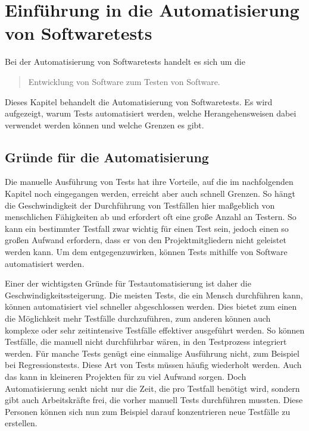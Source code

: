 \section{Einführung in die Automatisierung von Softwaretests}
Bei der Automatisierung von Softwaretests handelt es sich um die \begin{quote}Entwicklung von Software zum Testen von Software.~\cite[section 16.1 paragraph 2]{Gopalaswamy.2009}\end{quote} 
Dieses Kapitel behandelt die Automatisierung von Softwaretests. Es wird aufgezeigt, warum Tests automatisiert werden, welche Herangehensweisen dabei verwendet werden können und welche Grenzen es gibt.

\subsection{Gründe für die Automatisierung}
Die manuelle Ausführung von Tests hat ihre Vorteile, auf die im nachfolgenden Kapitel noch eingegangen werden, erreicht aber auch schnell Grenzen. So hängt die Geschwindigkeit der Durchführung von Testfällen hier maßgeblich von menschlichen Fähigkeiten ab und erfordert oft eine große Anzahl an Testern. So kann ein bestimmter Testfall zwar wichtig für einen Test sein, jedoch einen so großen Aufwand erfordern, dass er von den Projektmitgliedern nicht geleistet werden kann. Um dem entgegenzuwirken, können Tests mithilfe von Software automatisiert werden.
\newline


Einer der wichtigsten Gründe für Testautomatisierung ist daher die Geschwindigkeitssteigerung. Die meisten Tests, die ein Mensch durchführen kann, können automatisiert viel schneller abgeschlossen werden. Dies bietet zum einen die Möglichkeit mehr Testfälle durchzuführen, zum anderen können auch komplexe oder sehr zeitintensive Testfälle effektiver ausgeführt werden. So können Testfälle, die manuell nicht durchführbar wären, in den Testprozess integriert werden. 
Für manche Tests genügt eine einmalige Ausführung nicht, zum Beispiel bei Regressionstests. Diese Art von Tests müssen häufig wiederholt werden. Auch das kann in kleineren Projekten für zu viel Aufwand sorgen.
\newline
Doch Automatisierung senkt nicht nur die Zeit, die pro Testfall benötigt wird, sondern gibt auch Arbeitskräfte  frei, die vorher manuell Tests durchführen mussten. Diese Personen können sich nun zum Beispiel darauf konzentrieren neue Testfälle zu erstellen.
\newline


